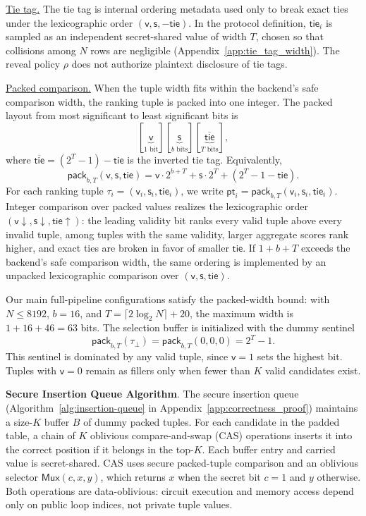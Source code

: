 \documentclass[conference,compsoc,letterpaper]{IEEEtran}
\theoremstyle{definition}
\theoremstyle{remark}
\newcommand{\myparagraph}[1]{\noindent \textbf{#1}.}
\newcommand{\myparagraphunderline}[1]{\noindent \underline{#1.}}
\newcommand{\policy}{\rho}
\newcommand{\scorebits}{b}
\newcommand{\EncTuple}[1]{\tau_{#1}}
\newcommand{\dummytuple}{\tau_{\bot}}
\newcommand{\valid}{\mathsf{v}}
\newcommand{\score}{\mathsf{s}}
\newcommand{\tie}{\mathsf{tie}}
\newcommand{\PackedTuple}{\mathsf{pt}}
\begin{document}
\myparagraphunderline{Tie tag}
The tie tag is internal ordering metadata used only to break exact ties under the lexicographic order $(\valid,\score,-\tie)$.
In the protocol definition, $\tie_i$ is sampled as an independent secret-shared value of width $T$, chosen so that collisions among $N$ rows are negligible (Appendix~\ref{app:tie_tag_width}).
The reveal policy $\policy$ does not authorize plaintext disclosure of tie tags.

\myparagraphunderline{Packed comparison}
When the tuple width fits within the backend's safe comparison width, the ranking tuple is packed into one integer. The packed layout from most significant to least significant bits is
\[
[\underbrace{\valid}_{1 \text{ bit}}]
[\underbrace{\score}_{\scorebits \text{ bits}}]
[\underbrace{\overline{\tie}}_{T \text{ bits}}],
\]
where $\overline{\tie}=(2^T-1)-\tie$ is the inverted tie tag.
Equivalently,
\[
\mathsf{pack}_{\scorebits,T}(\valid,\score,\tie)
=
\valid\cdot 2^{\scorebits+T}
+
\score\cdot 2^T
+
(2^T-1-\tie).
\]
For each ranking tuple $\EncTuple{i}=(\valid_i,\score_i,\tie_i)$, we write $\PackedTuple_i =
\mathsf{pack}_{\scorebits,T}(\valid_i,\score_i,\tie_i)$.
Integer comparison over packed values realizes the lexicographic order $(\valid\downarrow,\score\downarrow,\tie\uparrow)$: the leading validity bit ranks every valid tuple above every invalid tuple, among tuples with the same validity, larger aggregate scores rank higher, and exact ties are broken in favor of smaller $\tie$.
If $1+\scorebits+T$ exceeds the backend's safe comparison width, the same ordering is implemented by an unpacked lexicographic comparison over $(\valid,\score,\tie)$.

Our main full-pipeline configurations satisfy the packed-width bound:
with $N\le8192$, $\scorebits=16$, and
$T=\lceil 2\log_2 N\rceil+20$, the maximum width is
$1+16+46=63$ bits.
The selection buffer is initialized with the dummy sentinel
\[
\mathsf{pack}_{\scorebits,T}(\dummytuple)
=
\mathsf{pack}_{\scorebits,T}(0,0,0)
=
2^T-1 .
\]
This sentinel is dominated by any valid tuple, since $\valid=1$ sets the highest bit.
Tuples with $\valid=0$ remain as fillers only when fewer than $K$ valid candidates exist.
\smallskip

\myparagraph{Secure Insertion Queue Algorithm}
The secure insertion queue (Algorithm~\ref{alg:insertion-queue} in Appendix~\ref{app:correctness_proof}) maintains a size-$K$ buffer $B$ of dummy packed tuples.
For each candidate in the padded table, a chain of $K$ oblivious compare-and-swap (CAS) operations inserts it into the correct position if it belongs in the top-$K$.
Each buffer entry and carried value is secret-shared.
CAS uses secure packed-tuple comparison and an oblivious selector $\mathsf{Mux}(c,x,y)$, which returns $x$ when the secret bit $c=1$ and $y$ otherwise.
Both operations are data-oblivious: circuit execution and memory access depend only on public loop indices, not private tuple values.
\smallskip
\end{document}
